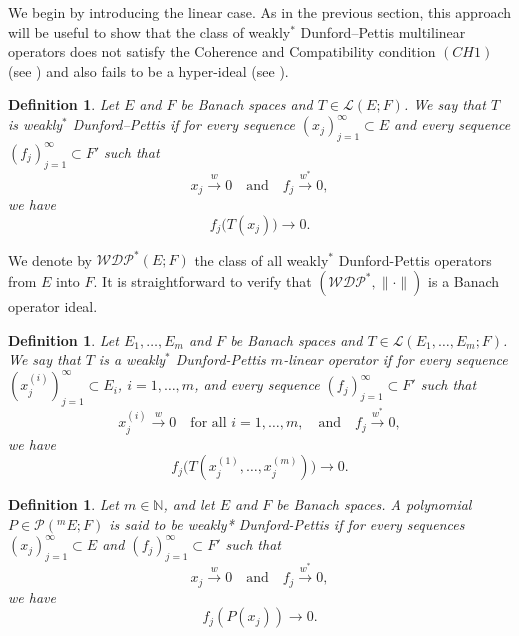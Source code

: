 \documentclass[12 pt]{article}%
\newtheorem{final remark}[theorem]{Final Remark}
\newtheorem{definition}[theorem]{Definition}
\begin{document}
We begin by introducing the linear case. As in the previous section, this approach will be useful to show that the class of weakly$^{*}$ Dunford--Pettis multilinear operators does not satisfy the Coherence and Compatibility condition $(CH1)$ (see \cite{PR14}) and also fails to be a hyper-ideal (see \cite{BT15}).

\begin{definition}
	Let $E$ and $F$ be Banach spaces and $T \in \mathcal{L}(E; F)$. We say that $T$ is \emph{weakly$^{*}$ Dunford--Pettis} if for every sequence $(x_j)_{j=1}^\infty \subset E$ and every sequence $(f_j)_{j=1}^\infty \subset F'$ such that
	\[
	x_j \overset{w}{\longrightarrow} 0
	\quad \text{and} \quad
	f_j \overset{w^{*}}{\longrightarrow} 0,
	\]
	we have
	\[
	f_j\big(T(x_j)\big) \longrightarrow 0.
	\]
\end{definition}

We denote by $\mathcal{WDP}^{*}(E; F)$ the class of all weakly$^{*}$ Dunford-Pettis operators from $E$ into $F$. It is straightforward to verify that $(\mathcal{WDP}^{*}, \|\cdot\|)$ is a Banach operator ideal.

\begin{definition}
	Let $E_1,\dots, E_m$ and $F$ be Banach spaces and $T \in \mathcal{L}(E_1,\dots, E_m; F)$. We say that $T$ is a \emph{weakly$^{*}$ Dunford-Pettis $m$-linear operator} if for every sequence $(x_j^{(i)})_{j=1}^{\infty} \subset E_i$, $i=1,\dots, m$, and every sequence $(f_j)_{j=1}^{\infty} \subset F'$ such that
	\[
	x_j^{(i)} \overset{w}{\longrightarrow} 0 \quad \text{for all } i=1,\dots, m,
	\quad \text{and} \quad
	f_j \overset{w^{*}}{\longrightarrow} 0,
	\]
	we have
	\[
	f_j\big(T(x_j^{(1)},\dots, x_j^{(m)})\big) \longrightarrow 0.
	\]
\end{definition}


\begin{definition}
	Let $m \in \mathbb{N}$, and let $E$ and $F$ be Banach spaces. A polynomial $P \in \mathcal{P}(^mE; F)$ is said to be \emph{weakly* Dunford-Pettis} if for every sequences $(x_j)_{j=1}^{\infty} \subset E$ and $(f_j)_{j=1}^{\infty} \subset F'$ such that
	\begin{equation*}
		x_j \overset{w}{\longrightarrow} 0 \quad \text{and} \quad f_j \overset{w^*}{\longrightarrow} 0,
	\end{equation*}
	we have
	\begin{equation*}
		f_j(P(x_j)) \longrightarrow 0.
	\end{equation*}
\end{definition}
\end{document}
